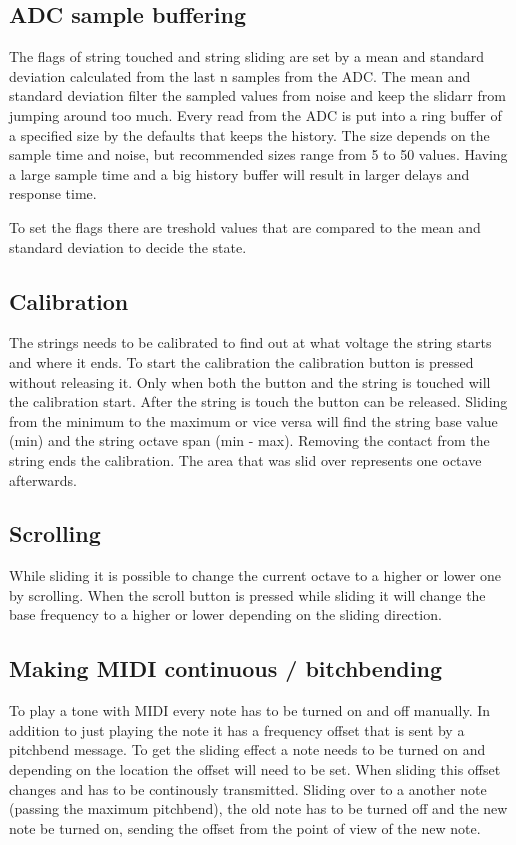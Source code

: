 \documentclass{article}
\begin{document}
\subsection{ADC sample buffering}
The flags of string touched and string sliding are set by a mean and standard deviation calculated from the last n samples from the ADC. The mean and standard deviation filter the sampled values from noise and keep the slidarr from jumping around too much.
Every read from the ADC is put into a ring buffer of a specified size by the defaults that keeps the history. The size depends on the sample time and noise, but recommended sizes range from 5 to 50 values. Having a large sample time and a big history buffer will result in larger delays and response time.

To set the flags there are treshold values that are compared to the mean and standard deviation to decide the state.

\subsection{Calibration}
The strings needs to be calibrated to find out at what voltage the string starts and where it ends. To start the calibration the calibration button is pressed without releasing it. Only when both the button and the string is touched will the calibration start. After the string is touch the button can be released. Sliding from the minimum to the maximum or vice versa will find the string base value (min) and the string octave span (min - max). Removing the contact from the string ends the calibration. The area that was slid over represents one octave afterwards.

\subsection{Scrolling}
While sliding it is possible to change the current octave to a higher or lower one by scrolling. When the scroll button is pressed while sliding it will change the base frequency to a higher or lower depending on the sliding direction.

\subsection{Making MIDI continuous / bitchbending}
To play a tone with MIDI every note has to be turned on and off manually. In addition to just playing the note it has a frequency offset that is sent by a pitchbend message. To get the sliding effect a note needs to be turned on and depending on the location the offset will need to be set. When sliding this offset changes and has to be continously transmitted. Sliding over to a another note (passing the maximum pitchbend), the old note has to be turned off and the new note be turned on, sending the offset from the point of view of the new note.
\end{document}
